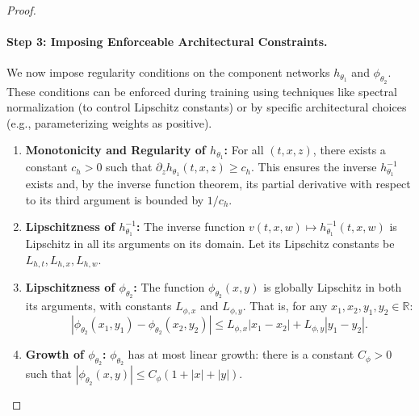 \documentclass[10pt,a4paper]{amsart}
\newcommand{\R}{\mathbb{R}}
\begin{document}
\begin{proof}
\paragraph{Step 3: Imposing Enforceable Architectural Constraints.}
We now impose regularity conditions on the component networks $h_{\theta_1}$ and $\phi_{\theta_2}$. These conditions can be enforced during training using techniques like spectral normalization (to control Lipschitz constants) or by specific architectural choices (e.g., parameterizing weights as positive).
\begin{enumerate}[label=(C\arabic*), leftmargin=*]
    \item \textbf{Monotonicity and Regularity of $h_{\theta_1}$:} For all $(t,x,z)$, there exists a constant $c_h > 0$ such that $\partial_z h_{\theta_1}(t,x,z) \ge c_h$. This ensures the inverse $h_{\theta_1}^{-1}$ exists and, by the inverse function theorem, its partial derivative with respect to its third argument is bounded by $1/c_h$.
    \item \textbf{Lipschitzness of $h_{\theta_1}^{-1}$:} The inverse function $v(t,x,w) \mapsto h_{\theta_1}^{-1}(t,x,w)$ is Lipschitz in all its arguments on its domain. Let its Lipschitz constants be $L_{h,t}, L_{h,x}, L_{h,w}$.
    \item \textbf{Lipschitzness of $\phi_{\theta_2}$:} The function $\phi_{\theta_2}(x,y)$ is globally Lipschitz in both its arguments, with constants $L_{\phi,x}$ and $L_{\phi,y}$. That is, for any $x_1, x_2, y_1, y_2 \in \R$:
    \[ |\phi_{\theta_2}(x_1, y_1) - \phi_{\theta_2}(x_2, y_2)| \le L_{\phi,x}|x_1-x_2| + L_{\phi,y}|y_1-y_2|. \]
    \item \textbf{Growth of $\phi_{\theta_2}$:} $\phi_{\theta_2}$ has at most linear growth: there is a constant $C_\phi > 0$ such that $|\phi_{\theta_2}(x,y)| \le C_\phi(1+|x|+|y|)$.
\end{enumerate}


\end{proof}
\end{document}
